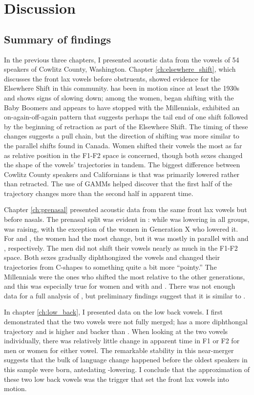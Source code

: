 \chapter{Discussion}
\label{ch:discussion}

\section{Summary of findings}

In the previous three chapters, I presented acoustic data from the vowels of 54 speakers of Cowlitz County, Washington. Chapter \ref{ch:elsewhere_shift}, which discusses the front lax vowels before obstruents, showed evidence for the Elsewhere Shift in this community. \bat has been in motion since at least the 1930s and shows signs of slowing down; among the women, \bet began shifting with the Baby Boomers and appears to have stopped with the Millennials, \bit exhibited an on-again-off-again pattern that suggests perhaps the tail end of one shift followed by the beginning of retraction as part of the Elsewhere Shift. The timing of these changes suggests a pull chain, but the direction of shifting was more similar to the parallel shifts found in Canada. Women shifted their vowels the most as far as relative position in the F1-F2 space is concerned, though both sexes changed the shape of the vowels' trajectories in tandem. The biggest difference between Cowlitz County speakers and Californians is that \bat was primarily lowered rather than retracted. The use of GAMMs helped discover that the first half of the trajectory changes more than the second half in apparent time.

Chapter \ref{ch:prenasal} presented acoustic data from the same front lax vowels but before nasals. The prenasal split was evident in \trap: while \bat was lowering in all groups, \ban was raising, with the exception of the women in Generation X who lowered it. For \ben and \bin, the women had the most change, but it was mostly in parallel with \bet and \bit, respectively. The men did not shift their vowels nearly as much in the F1-F2 space. Both sexes gradually diphthongized the vowels and changed their trajectories from C-shapes to something quite a bit more ``pointy.'' The Millennials were the ones who shifted the most relative to the other generations, and this was especially true for women and with \bang and \bing. There was not enough data for a full analysis of \beng, but preliminary findings suggest that it is similar to \bang.

In chapter \ref{ch:low_back}, I presented data on the low back vowels. I first demonstrated that the two vowels were not fully merged;  \thought has a more diphthongal trajectory and is higher and backer than \lot. When looking at the two vowels individually, there was relatively little change in apparent time in F1 or F2 for men or women for either vowel. The remarkable stability in this near-merger suggests that the bulk of language change happened before the oldest speakers in this sample were born, antedating \bat-lowering. I conclude that the approximation of these two low back vowels was the trigger that set the front lax vowels into motion.

